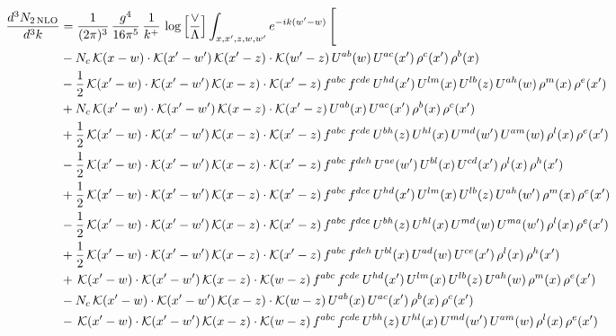 \documentclass[9pt]{article}
\numberwithin{equation}{section}
\begin{document}
\begin{align}
\frac{d^{3}N_{2\,\mathrm{NLO}}}{d^{3}k} & = \frac{1}{(2\pi)^{3}}\,\frac{g^{4}}{16\pi^{5}}\,\frac{1}{k^{+}}\,\log\Big[\frac{\vee}{\Lambda}\Big]\int_{x,x',z,w,w'}e^{-ik(w'-w)}\,\Bigg[\notag\\ & -N_{c}\,\mathcal{K}(x-w)\cdot\mathcal{K}(x'-w')\,\mathcal{K}(x'-z)\cdot\mathcal{K}(w'-z)\,U^{ab}(w)\,U^{ac}(x')\,\rho^{c}(x')\,\rho^{b}(x)\notag\\
& -\frac{1}{2}\,\mathcal{K}(x'-w)\cdot\mathcal{K}(x'-w')\,\mathcal{K}(x-z)\cdot\mathcal{K}(x'-z)\,f^{abc}\,f^{cde}\,U^{hd}(x')\,U^{lm}(x)\,U^{lb}(z)\,U^{ah}(w)\,\rho^{m}(x)\,\rho^{e}(x')\notag\\
& +N_{c}\,\mathcal{K}(x'-w)\cdot\mathcal{K}(x'-w')\,\mathcal{K}(x-z)\cdot\mathcal{K}(x'-z)\,U^{ab}(x)\,U^{ac}(x')\,\rho^{b}(x)\,\rho^{c}(x')\notag\\
& +\frac{1}{2}\,\mathcal{K}(x'-w)\cdot\mathcal{K}(x'-w')\,\mathcal{K}(x-z)\cdot\mathcal{K}(x'-z)\,f^{abc}\,f^{cde}\,U^{bh}(z)\,U^{hl}(x)\,U^{md}(w')\,U^{am}(w)\,\rho^{l}(x)\,\rho^{e}(x')\notag\\
& -\frac{1}{2}\,\mathcal{K}(x'-w)\cdot\mathcal{K}(x'-w')\,\mathcal{K}(x-z)\cdot\mathcal{K}(x'-z)\,f^{abc}\,f^{deh}\,U^{ae}(w')\,U^{bl}(x)\,U^{cd}(x')\,\rho^{l}(x)\,\rho^{h}(x')\notag \\ & +\frac{1}{2}\,\mathcal{K}(x'-w)\cdot\mathcal{K}(x'-w')\,\mathcal{K}(x-z)\cdot\mathcal{K}(x'-z)\,f^{abc}\,f^{dce}\,U^{hd}(x')\,U^{lm}(x)\,U^{lb}(z)\,U^{ah}(w')\,\rho^{m}(x)\,\rho^{e}(x')\notag\\
& -\frac{1}{2}\,\mathcal{K}(x'-w)\cdot\mathcal{K}(x'-w')\,\mathcal{K}(x-z)\cdot\mathcal{K}(x'-z)\,f^{abc}\,f^{dce}\,U^{bh}(z)\,U^{hl}(x)\,U^{md}(w)\,U^{ma}(w')\,\rho^{l}(x)\,\rho^{e}(x')\notag\\
& +\frac{1}{2}\,\mathcal{K}(x'-w)\cdot\mathcal{K}(x'-w')\,\mathcal{K}(x-z)\cdot\mathcal{K}(x'-z)\,f^{abc}\,f^{deh}\,U^{bl}(x)\,U^{ad}(w)\,U^{ce}(x')\,\rho^{l}(x)\,\rho^{h}(x')\notag\\
& +\,\mathcal{K}(x'-w)\cdot\mathcal{K}(x'-w')\,\mathcal{K}(x-z)\cdot\mathcal{K}(w-z)\,f^{abc}\,f^{cde}\,U^{hd}(x')\,U^{lm}(x)\,U^{lb}(z)\,U^{ah}(w)\,\rho^{m}(x)\,\rho^{e}(x')\notag\\
& -N_{c}\,\mathcal{K}(x'-w)\cdot\mathcal{K}(x'-w')\,\mathcal{K}(x-z)\cdot\mathcal{K}(w-z)\,U^{ab}(x)\,U^{ac}(x')\,\rho^{b}(x)\,\rho^{c}(x')\notag\\
& -\,\mathcal{K}(x'-w)\cdot\mathcal{K}(x'-w')\,\mathcal{K}(x-z)\cdot\mathcal{K}(w-z)\,f^{abc}\,f^{cde}\,U^{bh}(z)\,U^{hl}(x)\,U^{md}(w')\,U^{am}(w)\,\rho^{l}(x)\,\rho^{e}(x')\notag\\

\end{align}
\end{document}
